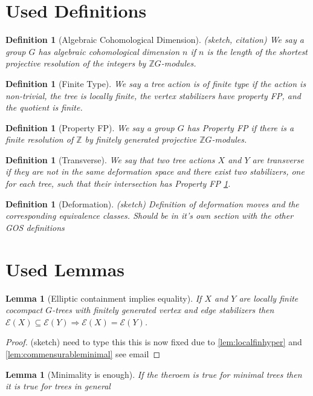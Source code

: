 \documentclass{article}
\theoremstyle{mystyle}
\newtheorem{lem}[thm]{Lemma}
\newtheorem{defn}[thm]{Definition}
\theoremstyle{remark}
\begin{document}
\section{Used Definitions}
\begin{defn}
    [Algebraic Cohomological Dimension]
    \label{defn:cd} 
    (sketch, citation)
    We say a group $G$ has algebraic cohomological dimension $n$ if $n$ is the length of the shortest projective resolution of the integers by $\mathbb{Z}G$-modules. 
\end{defn}
\begin{defn}
    [Finite Type]
    \label{defn:finitetype} 
    We say a tree action is of \emph{finite type} if the action is non-trivial, the tree is locally finite, the vertex stabilizers have property FP, and the quotient is finite.
\end{defn}
\begin{defn}
[Property FP]
\label{defn:propertyfp}
We say a group $G$ has Property FP if there is a finite resolution of $\mathbb{Z}$ by finitely generated projective $\mathbb{Z}G$-modules.
\end{defn}
\begin{defn}
    [Transverse]
    \label{defn:transverse} 
    We say that two tree actions $X$ and $Y$ are \emph{transverse} if they are not in the same deformation space and there exist two stabilizers, one for each tree, such that their intersection has Property FP \ref{defn:propertyfp}.
\end{defn}
\begin{defn}
    [Deformation]
    \label{defn:deformation}
    (sketch)
    Definition of deformation moves and the corresponding equivalence classes. Should be in it's own section with the other GOS definitions
\end{defn}
\section{Used Lemmas}
\begin{lem}
    [Elliptic containment implies equality]
    \label{thm:ellipticimpliesequality} 
    If \(X\) and \(Y\) are locally finite cocompact \(G\)-trees with finitely generated vertex and edge stabilizers then \(\mathcal{E}(X) \subseteq \mathcal{E}(Y) \Longrightarrow \mathcal{E}(X) = \mathcal{E}(Y) \). 
\end{lem}
\begin{proof}
        (sketch) need to type this
        this is now fixed due to \ref{lem:localfinhyper} and \ref{lem:commensurableminimal} see email
\end{proof}
\begin{lem}
    [Minimality is enough]
    \label{lem:minenough} 
    If the theroem is true for minimal trees then it is true for trees in general
\end{lem}
\end{document}
